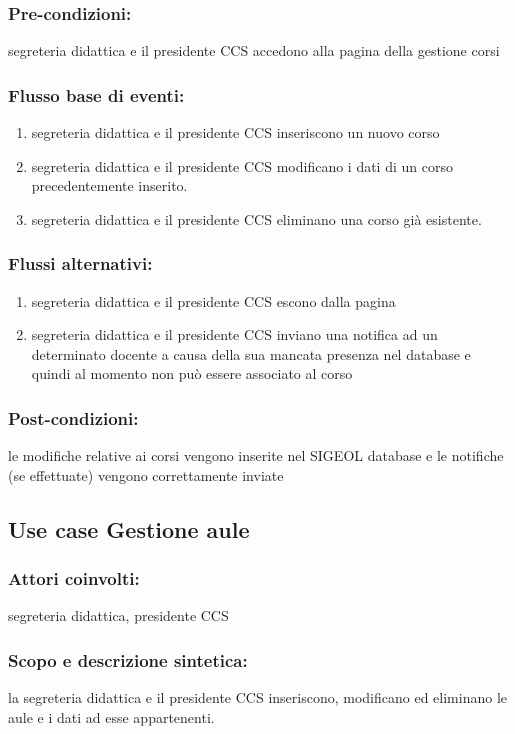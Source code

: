 \documentclass[11pt,a4paper]{article}
\begin{document}
\subsubsection*{Pre-condizioni:}
segreteria didattica e il presidente CCS accedono alla pagina della gestione corsi
\subsubsection*{Flusso base di eventi:}
\begin{enumerate}
 \item segreteria didattica e il presidente CCS inseriscono un nuovo corso 
 \item segreteria didattica e il presidente CCS modificano i dati di un corso precedentemente inserito.
 \item segreteria didattica e il presidente CCS eliminano una corso già esistente.
\end{enumerate}
\subsubsection*{Flussi alternativi:}
\begin{enumerate} 
\item segreteria didattica e il presidente CCS escono dalla pagina
\item segreteria didattica e il presidente CCS inviano una notifica ad un determinato docente a causa della sua mancata presenza nel database e quindi al momento non può essere associato al corso
\end{enumerate}
\subsubsection*{Post-condizioni:}
le modifiche relative ai corsi vengono inserite nel SIGEOL database e le notifiche (se effettuate) vengono correttamente 
inviate

\subsection{Use case Gestione aule}
\subsubsection*{Attori coinvolti:}
segreteria didattica, presidente CCS
\subsubsection*{Scopo e descrizione sintetica:}
la segreteria didattica e il presidente CCS inseriscono, modificano ed eliminano le aule e i dati ad esse appartenenti.
\end{document}
